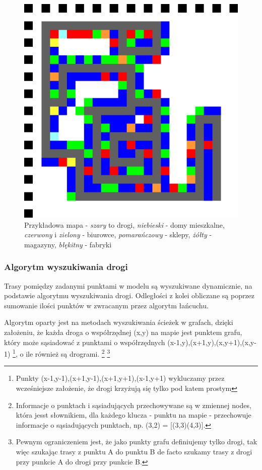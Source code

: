 \documentclass[polish, twoside, 12pt, a4paper]{article}
\theoremstyle{definition}
\theoremstyle{plain}
\theoremstyle{remark}
\begin{document}
\begin{figure} 
  \centering
\includegraphics[width=\linewidth]{../mapy/po_lokalizacji_sklepow.png}
  \caption{Przykładowa mapa - \textit{szary} to drogi, \textit{niebieski} - domy mieszkalne, \textit{czerwony} i \textit{zielony} - biurowce, \textit{pomarańczowy} - sklepy, \textit{żółty} - magazyny, \textit{błękitny} - fabryki}
  \label{fig:mapa}
\end{figure}


\subsubsection{Algorytm wyszukiwania drogi} 

Trasy pomiędzy zadanymi punktami w modelu są wyszukiwane dynamicznie, na podstawie algorytmu wyszukiwania drogi. Odległości z kolei obliczane są poprzez sumowanie ilości punktów w zwracanym przez algorytm łańcuchu. 

Algorytm oparty jest na metodach wyszukiwania ścieżek w grafach, dzięki założeniu, że każda droga o współrzędnej (x,y) na mapie jest punktem grafu, który może sąsiadować z punktami o współrzędnych (x-1,y),(x+1,y),(x,y+1),(x,y-1) \footnote{Punkty (x-1,y-1),(x+1,y-1),(x+1,y+1),(x-1,y+1) wykluczamy przez wcześniejsze założenie, że drogi krzyżują się tylko pod katem prostym}, o ile również są drogrami. \footnote{Informacje o punktach i sąsiadujących przechowywane są w zmiennej nodes, która jesst słownikiem, dla każdego klucza - punktu na mapie - przechowuje informacje o sąsiadujących punktach, np. (3,2) = [(3,3)(4,3)].} \footnote{Pewnym ograniczeniem jest, że jako punkty grafu definiujemy tylko drogi, tak więc szukając trasy z punktu A do punktu B de facto szukamy trasy z drogi przy punkcie A do drogi przy punkcie B.}
\end{document}
